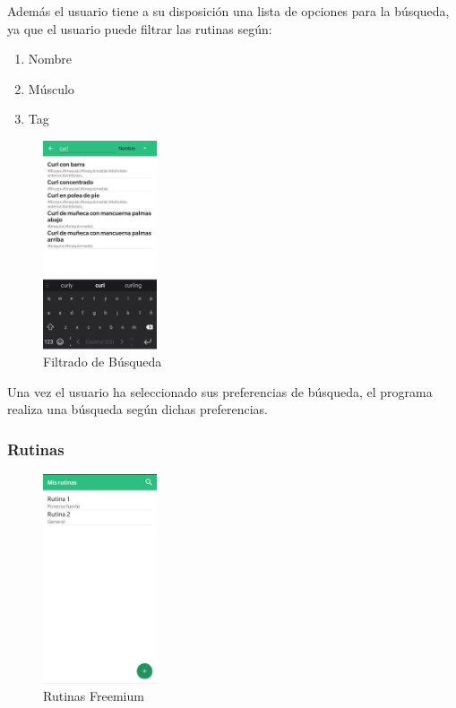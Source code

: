 \documentclass[11pt,a4paper]{report}
\begin{document}
Además el usuario tiene a su disposición una lista de opciones para  la búsqueda, ya que el usuario puede filtrar las rutinas según:
\begin{enumerate}
	\item Nombre

	\item Músculo

	\item Tag

\end{enumerate}
\begin{figure}[H]
	\centering
	\includegraphics[width=0.3\textwidth]{graficos/manual/FiltradoBusqueda.jpg}
	\caption{Filtrado de Búsqueda}
\end{figure}

Una vez el usuario ha seleccionado sus preferencias de búsqueda, el programa realiza una búsqueda según dichas preferencias.
\subsubsection{Rutinas}
\begin{figure}[H]
	\centering
	\includegraphics[width=0.3\textwidth]{graficos/manual/RutinasFreemium.jpg}
	\caption{Rutinas Freemium}
\end{figure}
\end{document}
